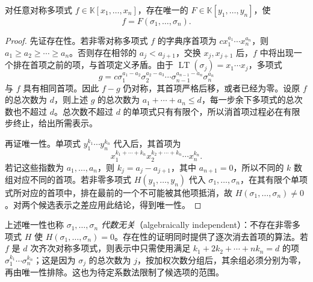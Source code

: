 \begin{theorem}[对称多项式基本定理]
\label{thm:fundamental-symmetric-polynomials}
对任意对称多项式 $f\in\mathbb K[x_1,\ldots,x_n]$，存在唯一的 $F\in\mathbb K[y_1,\ldots,y_n]$，使
\begin{equation}
\label{eq:symmetric-polynomial-representation}
    f=F(\sigma_1,\ldots,\sigma_n).
\end{equation}
\end{theorem}
\begin{proof}
先证存在性。若非零对称多项式 $f$ 的字典序首项为 $cx_1^{a_1}\cdots x_n^{a_n}$，则 $a_1\geq a_2\geq\cdots\geq a_n$。否则存在相邻的 $a_j<a_{j+1}$，交换 $x_j,x_{j+1}$ 后，$f$ 中将出现一个排在首项之前的项，与首项定义矛盾。由于 $\operatorname{LT}(\sigma_j)=x_1\cdots x_j$，多项式
\[
    g=c\sigma_1^{a_1-a_2}\sigma_2^{a_2-a_3}\cdots
    \sigma_{n-1}^{a_{n-1}-a_n}\sigma_n^{a_n}
\]
与 $f$ 具有相同首项。因此 $f-g$ 仍对称，其首项严格后移，或者已经为零。设原 $f$ 的总次数为 $d$，则上述 $g$ 的总次数为 $a_1+\cdots+a_n\leq d$，每一步余下多项式的总次数也不超过 $d$。总次数不超过 $d$ 的单项式只有有限个，所以消首项过程必在有限步终止，给出所需表示。

再证唯一性。单项式 $y_1^{k_1}\cdots y_n^{k_n}$ 代入后，其首项为
\[
    x_1^{k_1+\cdots+k_n}x_2^{k_2+\cdots+k_n}\cdots x_n^{k_n}.
\]
若记这些指数为 $a_1,\ldots,a_n$，则 $k_j=a_j-a_{j+1}$，其中 $a_{n+1}=0$，所以不同的 $k$ 数组对应不同的首项。若非零多项式 $H(y_1,\ldots,y_n)$ 代入 $\sigma_1,\ldots,\sigma_n$，在其有限个单项式所对应的首项中，排在最前的一个不可能被其他项抵消，故 $H(\sigma_1,\ldots,\sigma_n)\ne0$。对两个候选表示之差应用此结论，得到唯一性。
\end{proof}

上述唯一性也称 $\sigma_1,\ldots,\sigma_n$ \emph{代数无关}（algebraically independent）：不存在非零多项式 $H$ 使 $H(\sigma_1,\ldots,\sigma_n)=0$。存在性的证明同时提供了逐次消去首项的算法。若 $f$ 是 $d$ 次齐次对称多项式，则表示中只需使用满足 $k_1+2k_2+\cdots+nk_n=d$ 的项 $\sigma_1^{k_1}\cdots\sigma_n^{k_n}$；这是因为 $\sigma_j$ 的总次数为 $j$，按加权次数分组后，其余组必须分别为零，再由唯一性排除。这也为待定系数法限制了候选项的范围。

